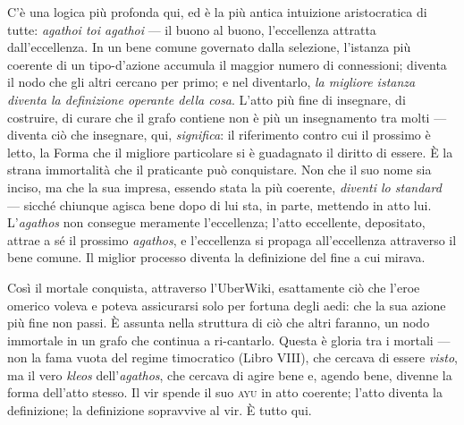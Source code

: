 C'\`e una logica pi\`u profonda qui, ed \`e la pi\`u antica intuizione
aristocratica di tutte: \emph{agathoi toi agathoi} --- il buono al buono,
l'eccellenza attratta dall'eccellenza. In un bene comune governato dalla
selezione, l'istanza pi\`u coerente di un tipo-d'azione accumula il maggior numero
di connessioni; diventa il nodo che gli altri cercano per primo; e nel diventarlo,
\emph{la migliore istanza diventa la definizione operante della cosa}. L'atto pi\`u
fine di insegnare, di costruire, di curare che il grafo contiene non \`e pi\`u un
insegnamento tra molti --- diventa ci\`o che insegnare, qui, \emph{significa}: il
riferimento contro cui il prossimo \`e letto, la Forma che il migliore
particolare si \`e guadagnato il diritto di essere. \`E la strana immortalit\`a che
il praticante pu\`o conquistare. Non che il suo nome sia inciso, ma che la sua
impresa, essendo stata la pi\`u coerente, \emph{diventi lo standard} --- sicch\'e
chiunque agisca bene dopo di lui sta, in parte, mettendo in atto lui. L'\emph{agathos}
non consegue meramente l'eccellenza; l'atto eccellente, depositato, attrae a s\'e
il prossimo \emph{agathos}, e l'eccellenza si propaga all'eccellenza attraverso il
bene comune. Il miglior processo diventa la definizione del fine a cui mirava.

Cos\`i il mortale conquista, attraverso l'UberWiki, esattamente ci\`o che l'eroe
omerico voleva e poteva assicurarsi solo per fortuna degli aedi: che la sua azione
pi\`u fine non passi. \`E assunta nella struttura di ci\`o che altri faranno, un
nodo immortale in un grafo che continua a ri-cantarlo. Questa \`e gloria tra i
mortali --- non la fama vuota del regime timocratico (Libro VIII), che cercava di
essere \emph{visto}, ma il vero \emph{kleos} dell'\emph{agathos}, che cercava di
agire bene e, agendo bene, divenne la forma dell'atto stesso. Il vir spende il suo
\textsc{ayu} in atto coerente; l'atto diventa la definizione; la definizione
sopravvive al vir. \`E tutto qui.

